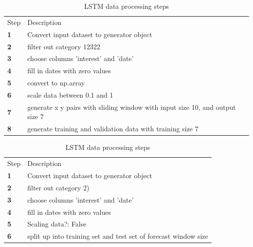 \begin{table}[h]
  \centering
  \caption{LSTM data processing steps}
  \label{table:lstm_data_processing_steps}
  \begin{tabular}{ll}
    \toprule
    Step       & Description                                                                  \\
    \textbf{1} & Convert input dataset to generator object                                    \\
    \textbf{2} & filter out category 12322                                                    \\
    \textbf{3} & choose columns 'interest' and 'date'                                         \\
    \textbf{4} & fill in dates with zero values                                               \\
    \textbf{5} & convert to np.array                                                          \\
    \textbf{6} & scale data between 0.1 and 1                                                 \\
    \textbf{7} & generate x y pairs with sliding window with input size 10, and output size 7 \\
    \textbf{8} & generate training and validation data with training size 7                   \\
    \bottomrule
  \end{tabular}
\end{table}
\begin{table}[h]
  \centering
  \caption{LSTM data processing steps}
  \label{table:arima_data_processing_steps}
  \begin{tabular}{ll}
    \toprule
    Step       & Description                                                     \\
    \textbf{1} & Convert input dataset to generator object                       \\
    \textbf{2} & filter out category 2)                                          \\
    \textbf{3} & choose columns 'interest' and 'date'                            \\
    \textbf{4} & fill in dates with zero values                                  \\
    \textbf{5} & Scaling data?: False                                            \\
    \textbf{6} & split up into training set and test set of forecast window size \\
    \bottomrule
  \end{tabular}
\end{table}

